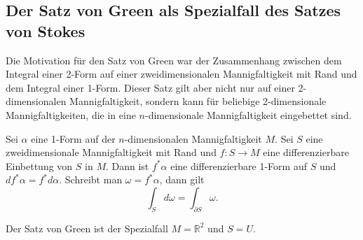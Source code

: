 %
%
\subsection{Der Satz von Green als Spezialfall des Satzes von Stokes}
Die Motivation für den Satz von Green war der Zusammenhang zwischen
dem Integral einer 2-Form auf einer zweidimensionalen Mannigfaltigkeit
mit Rand und dem Integral einer 1-Form.
Dieser Satz gilt aber nicht nur auf einer 2-dimensionalen Mannigfaltigkeit,
sondern kann für beliebige 2-dimensionale Mannigfaltigkeiten, die in
eine $n$-dimensionale Mannigfaltigkeit eingebettet sind.
%

\begin{satz}[Stokes]
\label{buch:green:green:satz:stokes}
Sei $\alpha$ eine 1-Form auf der $n$-dimensionalen Mannigfaltigkeit $M$.
Sei $S$ eine zweidimensionale Mannigfaltigkeit mit Rand und
$f\colon S\to M$ eine differenzierbare Einbettung von $S$ in $M$.
Dann ist $f^*\alpha$ eine differenzierbare 1-Form auf $S$ und
$df^*\alpha=f^*d\alpha$.
Schreibt man $\omega=f^*\alpha$,
dann gilt
\[
\int_S d\omega
=
\int_{\partial S}\omega.
\]
\end{satz}

Der Satz von Green ist der Spezialfall $M=\mathbb{R}^2$ und $S=U$.

